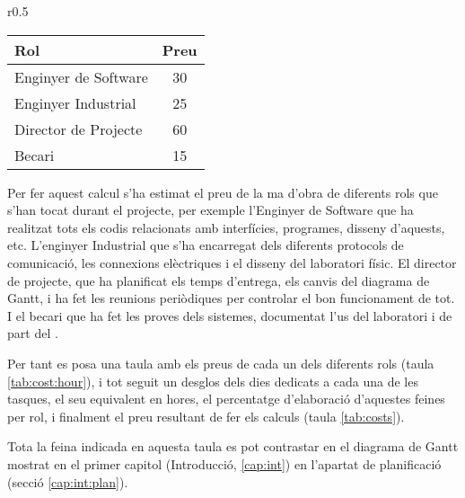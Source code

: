 \begin{wraptable}{r}{0.5\textwidth}

\begin{center}
	\begin{tabular}{|| l | c ||}
\hline
\textbf{Rol} 	&\textbf{Preu}\\
\hline
\hline
Enginyer de Software	&30\\
\hline
Enginyer Industrial	&25\\
\hline
Director de Projecte	&60\\
\hline
Becari	&15\\
\hline
	\end{tabular}
\end{center}
	\caption[Preus hora de cada rol]{Preu de cada rol en Euros/hora}
	\label{tab:cost:hour}

\end{wraptable}

Per fer aquest calcul s'ha estimat el preu de la ma d'obra de diferents rols que s'han tocat durant el projecte, per exemple l'Enginyer de Software que ha realitzat tots els codis relacionats amb interfícies, programes, disseny d'aquests, etc. L'enginyer Industrial que s'ha encarregat dels diferents protocols de comunicació, les connexions elèctriques i el disseny del laboratori físic. El director de projecte, que ha planificat els temps d'entrega, els canvis del diagrama de Gantt, i ha fet les reunions periòdiques per controlar el bon funcionament de tot. I el becari que ha fet les proves dels sistemes, documentat l'us del laboratori i de part del \LiveCD.

Per tant es posa una taula amb els preus de cada un dels diferents rols (taula \ref{tab:cost:hour}), i tot seguit un desglos dels dies dedicats a cada una de les tasques, el seu equivalent en hores, el percentatge d'elaboració d'aquestes feines per rol, i finalment el preu resultant de fer els calculs (taula \ref{tab:costs}).



Tota la feina indicada en aquesta taula es pot contrastar en el diagrama de Gantt mostrat en el primer capitol (Introducció, \ref{cap:int}) en l'apartat de planificació (secció \ref{cap:int:plan}).


